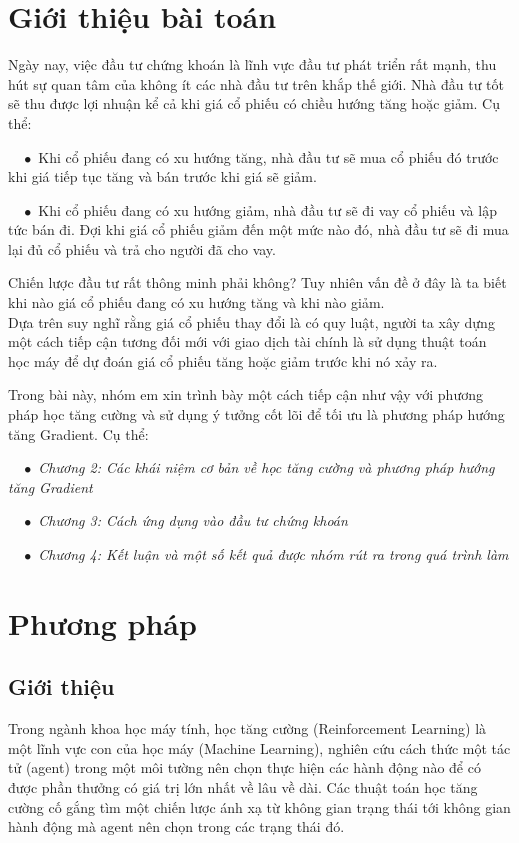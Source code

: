 \documentclass[14pt]{extreport}
\begin{document}
\tableofcontents
\newpage


\newpage
\chapter{Giới thiệu bài toán}

Ngày nay, việc đầu tư chứng khoán là lĩnh vực đầu tư phát triển rất mạnh, thu hút sự quan tâm của không ít các nhà đầu tư trên khắp thế giới. Nhà đầu tư tốt sẽ thu được lợi nhuận kể cả khi giá cổ phiếu có chiều hướng tăng hoặc giảm. Cụ thể:

$\quad \bullet$ Khi cổ phiếu đang có xu hướng tăng, nhà đầu tư sẽ mua cổ phiếu đó trước khi giá tiếp tục tăng và bán trước khi giá sẽ giảm.

$\quad \bullet$ Khi cổ phiếu đang có xu hướng giảm, nhà đầu tư sẽ đi vay cổ phiếu và lập tức bán đi. Đợi khi giá cổ phiếu giảm đến một mức nào đó, nhà đầu tư sẽ đi mua lại đủ cổ phiếu và trả cho người đã cho vay.

Chiến lược đầu tư rất thông minh phải không? Tuy nhiên vấn đề ở đây là ta biết khi nào giá cổ phiếu đang có xu hướng tăng và khi nào giảm.
\\ 

Dựa trên suy nghĩ rằng giá cổ phiếu thay đổi là có quy luật, người ta xây dựng một cách tiếp cận tương đối mới với giao dịch tài chính là sử dụng thuật toán học máy để dự đoán giá cổ phiếu tăng hoặc giảm trước khi nó xảy ra.

Trong bài này, nhóm em xin trình bày một cách tiếp cận như vậy với phương pháp học tăng cường và sử dụng ý tưởng cốt lõi để tối ưu là phương pháp hướng tăng Gradient. Cụ thể:

$\quad \bullet$ \textit{Chương 2: Các khái niệm cơ bản về học tăng cường và phương pháp hướng tăng Gradient}

$\quad \bullet$ \textit{Chương 3: Cách ứng dụng vào đầu tư chứng khoán}

$\quad \bullet$ \textit{Chương 4: Kết luận và một số kết quả được nhóm rút ra trong quá trình làm}

\chapter{Phương pháp}
\section{Giới thiệu}

 Trong ngành khoa học máy tính, học tăng cường (Reinforcement Learning) là một lĩnh vực con của học máy (Machine Learning), nghiên cứu cách thức một tác tử (agent) trong một môi tường nên chọn thực hiện các hành động nào để có được phần thưởng có giá trị lớn nhất về lâu về dài. Các thuật toán học tăng cường cố gắng tìm một chiến lược ánh xạ từ không gian trạng thái tới không gian hành động mà agent nên chọn trong các trạng thái đó.
 
\end{document}
